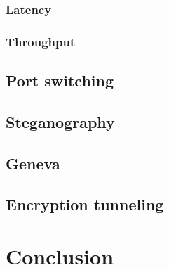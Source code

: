 \documentclass[12pt, fleqn, a4paper]{article}
\begin{document}
\subsubsection{Latency}
\subsubsection{Throughput}
\subsection{Port switching}
\subsection{Steganography}
\subsection{Geneva}
\subsection{Encryption tunneling}
\section*{\centering Conclusion}

%
\end{document}
